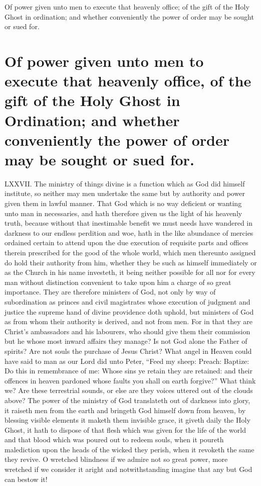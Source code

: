 Of power given unto men to execute that heavenly office; of the gift of the Holy Ghost in ordination; and whether conveniently the power of order may be sought or sued for.
\section*{Of power given unto men to execute that heavenly office, of the gift of the Holy Ghost in Ordination; and whether conveniently the power of order may be sought or sued for.}
LXXVII. The ministry of things divine is a function which as God did himself institute, so neither may men undertake the same but by authority and power given them in lawful manner. That God which is no way deficient or wanting unto man in necessaries, and hath therefore given us the light of his heavenly truth, because without that inestimable benefit we must needs have wandered in darkness to our endless perdition and woe, hath in the like abundance of mercies ordained certain to attend upon the due execution of requisite parts and offices therein prescribed for the good of the whole world, which men thereunto assigned do hold their authority from him, whether they be such as himself immediately or as the Church in his name investeth, it being neither possible for all nor for every man without distinction convenient to take upon him a charge of so great importance. They are therefore ministers of God, not only by way of subordination as princes and civil magistrates whose execution of judgment and justice the supreme hand of divine providence doth uphold, but ministers of God as from whom their authority is derived, and not from men. For in that they are Christ’s ambassadors and his labourers, who should give them their commission but he whose most inward affairs they manage? Is not God alone the Father of spirits? Are not souls the purchase of Jesus Christ? What angel in Heaven could have said to man as our Lord did unto Peter, “Feed my sheep: Preach: Baptize: Do this in remembrance of me: Whose sins ye retain they are  retained:
 and their offences in heaven pardoned whose faults you shall on earth forgive?” What think we? Are these terrestrial sounds, or else are they voices uttered out of the clouds above? The power of the ministry of God translateth out of darkness into glory, it raiseth men from the earth and bringeth God himself down from heaven, by blessing visible elements it maketh them invisible grace, it giveth daily the Holy Ghost, it hath to dispose of that flesh which was given for the life of the world and that blood which was poured out to redeem souls, when it poureth malediction upon the heads of the wicked they perish, when it revoketh the same they revive. O wretched blindness if we admire not so great power, more wretched if we consider it aright and notwithstanding imagine that any but God can bestow it!

